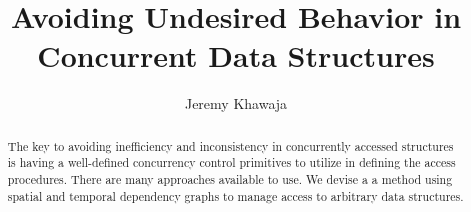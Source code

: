 \documentclass[english]{article}
\begin{document}
	
\hypersetup{
	linktoc=all,     %
	linkcolor=blue,  %
}

\title{Avoiding Undesired Behavior in Concurrent Data Structures}
\author{Jeremy Khawaja}
\maketitle

\begin{abstract}
		The key to avoiding inefficiency and inconsistency in concurrently accessed structures is having a well-defined concurrency control primitives to utilize in defining the access procedures. There are many approaches available to use. We devise a a method using spatial and temporal dependency graphs to manage access to arbitrary data structures.
\end{abstract}
\twocolumn




%



\end{document}
